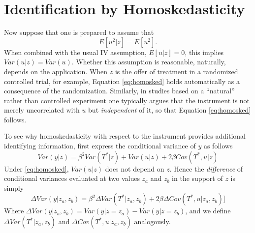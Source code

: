 \section{Identification by Homoskedasticity}

Now suppose that one is prepared to assume that
\begin{equation}
  E[u^2|z]=E[u^2].
  \label{eq:homosked}
\end{equation}
When combined with the usual IV assumption, $E[u|z]=0$, this implies $Var(u|z) = Var(u)$.
Whether this assumption is reasonable, naturally, depends on the application.
When $z$ is the offer of treatment in a randomized controlled trial, for example, Equation \ref{eq:homosked} holds automatically as a consequence of the randomization.
Similarly, in studies based on a ``natural'' rather than controlled experiment one typically argues that the instrument is not merely uncorrelated with $u$ but \emph{independent} of it, so that Equation \ref{eq:homosked} follows.

To see why homoskedasticity with respect to the instrument provides additional identifying information, first express the conditional variance of $y$ as follows
\begin{equation}
 Var(y|z) = \beta^2 Var\left( T^*|z \right) + Var(u|z) + 2\beta Cov(T^*,u|z)
  \label{eq:varyz}
\end{equation}
Under \ref{eq:homosked}, $Var(u|z)$ does not depend on $z$.
Hence the \emph{difference} of conditional variances evaluated at two values $z_a$ and $z_b$ in the support of $z$ is simply
\begin{equation}
  \Delta Var(y|z_a,z_b) = \beta^2\Delta Var(T^*|z_a,z_b) + 2\beta \Delta Cov(T^*,u|z_a, z_b)]
  \label{eq:varydiff}
\end{equation}
Where $\Delta Var(y|z_a,z_b) = Var(y|z = z_a) - Var(y|z = z_b)$, and we define $\Delta Var(T^*|z_a, z_b)$ and $\Delta Cov(T^*,u|z_a,z_b)$ analogously.  

